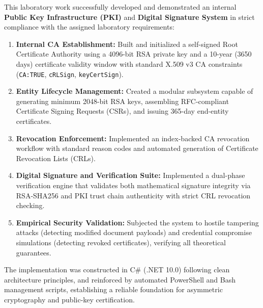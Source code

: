 \documentclass[12pt,a4paper]{article}
\begin{document}
This laboratory work successfully developed and demonstrated an internal \textbf{Public Key Infrastructure (PKI)} and \textbf{Digital Signature System} in strict compliance with the assigned laboratory requirements:
\begin{enumerate}
    \item \textbf{Internal CA Establishment:} Built and initialized a self-signed Root Certificate Authority using a 4096-bit RSA private key and a 10-year (3650 days) certificate validity window with standard X.509 v3 CA constraints (\texttt{CA:TRUE}, \texttt{cRLSign}, \texttt{keyCertSign}).
    \item \textbf{Entity Lifecycle Management:} Created a modular subsystem capable of generating minimum 2048-bit RSA keys, assembling RFC-compliant Certificate Signing Requests (CSRs), and issuing 365-day end-entity certificates.
    \item \textbf{Revocation Enforcement:} Implemented an index-backed CA revocation workflow with standard reason codes and automated generation of Certificate Revocation Lists (CRLs).
    \item \textbf{Digital Signature and Verification Suite:} Implemented a dual-phase verification engine that validates both mathematical signature integrity via RSA-SHA256 and PKI trust chain authenticity with strict CRL revocation checking.
    \item \textbf{Empirical Security Validation:} Subjected the system to hostile tampering attacks (detecting modified document payloads) and credential compromise simulations (detecting revoked certificates), verifying all theoretical guarantees.
\end{enumerate}

The implementation was constructed in C\# (.NET 10.0) following clean architecture principles, and reinforced by automated PowerShell and Bash management scripts, establishing a reliable foundation for asymmetric cryptography and public-key certification.
\end{document}
